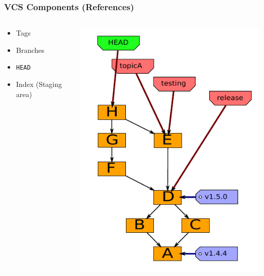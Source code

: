 \documentclass[english,compress]{beamer}
\newcommand{\cw}{\texttt} %
\begin{document}
\frame
{
    \frametitle{VCS Components (References)}

    \begin{columns}
        \begin{column}{.5\textwidth}
    \begin{itemize}
        \item Tags
        \item Branches
        \item \cw{HEAD}
        \item Index (Staging area)
    \end{itemize}
\end{column}
\begin{column}{.5\textwidth}
    \includegraphics[width=\textwidth]{figs/references.png}
\end{column}
\end{columns}
}
\end{document}
